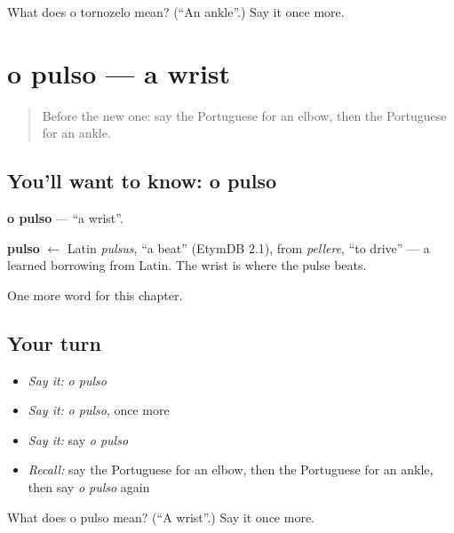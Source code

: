 \begin{tcolorbox}[breakable,colback=teal!4,colframe=teal!35!black,title={Before you move on}]
What does o tornozelo mean? (\textquotedblleft{}An ankle\textquotedblright{}.) Say it once more.
\end{tcolorbox}
\section[o pulso]{o pulso — a wrist}

\label{lesson:PT-C120-pulso}



\begin{quote}
Before the new one: say the Portuguese for an elbow, then the Portuguese for an ankle.
\end{quote}

\subsection*{You'll want to know: o pulso}
\textbf{o pulso} — \textquotedblleft{}a wrist\textquotedblright{}.

\begin{cousinweb}
\textbf{pulso} $\leftarrow$ Latin \emph{pulsus}, \textquotedblleft{}a beat\textquotedblright{} (EtymDB 2.1), from \emph{pellere}, \textquotedblleft{}to drive\textquotedblright{} — a learned borrowing from Latin. The wrist is where the pulse beats.
\end{cousinweb}

\begin{grammarlens}[title={What you've built}]
One more word for this chapter.
\end{grammarlens}

\subsection*{Your turn}
\begin{itemize}
\raggedright
  \item \emph{Say it:} \emph{o pulso}
  \item \emph{Say it:} \emph{o pulso}, once more
  \item \emph{Say it:} say \emph{o pulso}
  \item \emph{Recall:} say the Portuguese for an elbow, then the Portuguese for an ankle, then say \emph{o pulso} again
\end{itemize}

\begin{tcolorbox}[breakable,colback=teal!4,colframe=teal!35!black,title={Before you move on}]
What does o pulso mean? (\textquotedblleft{}A wrist\textquotedblright{}.) Say it once more.
\end{tcolorbox}

